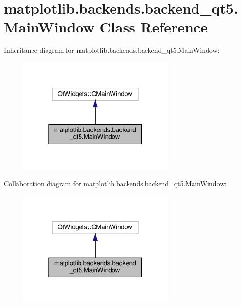 \hypertarget{classmatplotlib_1_1backends_1_1backend__qt5_1_1MainWindow}{}\section{matplotlib.\+backends.\+backend\+\_\+qt5.\+Main\+Window Class Reference}
\label{classmatplotlib_1_1backends_1_1backend__qt5_1_1MainWindow}


Inheritance diagram for matplotlib.\+backends.\+backend\+\_\+qt5.\+Main\+Window\+:
\nopagebreak
\begin{figure}[H]
\begin{center}
\leavevmode
\includegraphics[width=223pt]{classmatplotlib_1_1backends_1_1backend__qt5_1_1MainWindow__inherit__graph}
\end{center}
\end{figure}


Collaboration diagram for matplotlib.\+backends.\+backend\+\_\+qt5.\+Main\+Window\+:
\nopagebreak
\begin{figure}[H]
\begin{center}
\leavevmode
\includegraphics[width=223pt]{classmatplotlib_1_1backends_1_1backend__qt5_1_1MainWindow__coll__graph}
\end{center}
\end{figure}
